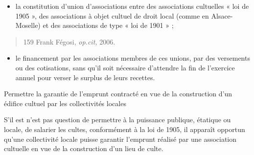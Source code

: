 \begin{itemize}
\item
  la constitution d'union d'associations entre des associations
  cultuelles « loi de 1905 », des associations à objet cultuel de droit
  local (comme en Alsace-Moselle) et des associations de type « loi de
  1901 » ;
\end{itemize}

\begin{quote}
159 Frank Fégosi, \emph{op.cit,} 2006.


\end{quote}

\begin{itemize}
\item
  le financement par les associations membres de ces unions, par des
  versements ou des cotisations, sans qu'il soit nécessaire d'attendre
  la fin de l'exercice annuel pour verser le surplus de leurs recettes.
\end{itemize}

Permettre la garantie de l'emprunt contracté en vue de la construction
d'un édifice cultuel par les collectivités locales

S'il est n'est pas question de permettre à la puissance publique,
étatique ou locale, de salarier les cultes, conformément à la loi de
1905, il apparaît opportun qu'une collectivité locale puisse garantir
l'emprunt réalisé par une association cultuelle en vue de la
construction d'un lieu de culte.


